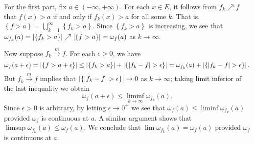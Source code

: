 \begin{exercise}{4.18}
  For the first part, fix $a \in (-\infty, +\infty)$.
  For each $x \in E$,
  it follows from $f_k \nearrow f$ that
  $f(x) > a$ if and only if $f_k(x) > a$ for all some $k$.
  That is, $\left\{ f > a \right\} = \bigcup_{k=1}^{\infty} \left\{ f_k > a \right\}$.
  Since $\left\{ f_k > a \right\}$ is increasing,
  we see that $\omega_{f_k}(a) = \left\vert\left\{ f_k > a \right\}\right\vert \nearrow
  \left\vert\left\{ f > a \right\}\right\vert = \omega_f(a)$ as $k \rightarrow \infty$.

  Now suppose $f_k \xrightarrow{m} f$.
  For each $\epsilon > 0$, we have
  \[
    \omega_f(a + \epsilon) = \left\vert\left\{ f > a + \epsilon \right\}\right\vert \le
    \left\vert\left\{ f_k > a \right\}\right\vert + \left\vert\left\{ \lvert f_k - f \rvert > \epsilon \right\}\right\vert
    = \omega_{f_k}(a) + \left\vert\left\{ \lvert f_k - f \rvert > \epsilon \right\}\right\vert.
  \]
  But $f_k \xrightarrow{m} f$ implies that
  $\left\vert\left\{ \lvert f_k - f \rvert > \epsilon \right\}\right\vert \rightarrow 0$
  as $k \rightarrow \infty$;
  taking limit inferior of the last inequality we obtain
  \[
    \omega_f(a + \epsilon) \le \liminf_{k \rightarrow \infty} \omega_{f_k}(a).
  \]
  Since $\epsilon > 0$ is arbitrary,
  by letting $\epsilon \rightarrow 0^+$ we see that
  $\omega_f(a) \le \liminf \omega_{f_k}(a)$
  provided $\omega_f$ is continuous at $a$.
  A similar argument shows that $\limsup \omega_{f_k}(a) \le \omega_f(a)$.
  We conclude that $\lim \omega_{f_k}(a) = \omega_f(a)$
  provided $\omega_f$ is continuous at $a$.
\end{exercise}
